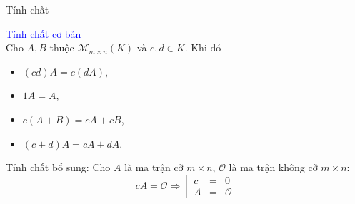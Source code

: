 \documentclass[pdf,10pt]{beamer}
\begin{document}
\begin{frame}{Tính chất}
	\begin{tcolorbox}
		\textcolor{blue}{Tính chất cơ bản}  \\
		Cho $A,B$ thuộc $\mathcal{M}_{m \times n}(K)$ và $c,d \in K$. Khi đó
		\begin{itemize}
			\item $(cd)A=c(dA)$,
			\pause
			\item $1A=A$,
			\pause
			\item $c(A+B)=cA+cB$,
			\pause
			\item $(c+d)A=cA+dA$.
		\end{itemize}
	\end{tcolorbox}
	{
	Tính chất bổ sung: Cho $A$ là ma trận cỡ $m \times n$, $\mathcal{O}$ là ma trận không cỡ $m \times n$:
	\begin{displaymath}
		cA = \mathcal{O} \Rightarrow
		\left[
		\begin{array}{cll}
			c & = & 0  \\
			A & = & \mathcal{O} 
		\end{array}
		\right.
	\end{displaymath}
	}
\end{frame}
\end{document}
